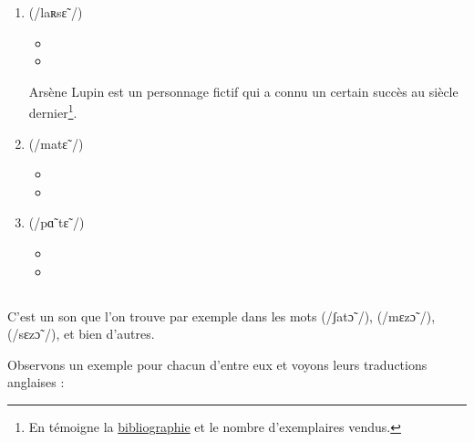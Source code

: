 \begin{enumerate}
\item {} (/laʀsɛ̃ /)
  \begin{itemize}
  \item {}
    \item {}
    \end{itemize}
    Arsène Lupin est un personnage fictif qui a connu un certain
    succès au siècle dernier\footnote{En témoigne la
      \href{https://www.amazon.fr/gp/product/B01N7I8WHS/ref=as_li_tl?ie=UTF8&camp=1642&creative=6746&creativeASIN=B01N7I8WHS&linkCode=as2&tag=wwwbecomefree-21&linkId=b8a42c0dbe0bb02385db28679d7e46fd}{bibliographie}
      et le nombre d'exemplaires vendus.}.
\item {} (/matɛ̃ /)
  \begin{itemize}
  \item {}
  \item {}
  \end{itemize}
\item {} (/pɑ̃ tɛ̃ /)
  \begin{itemize}
  \item {}
  \item {}
  \end{itemize}
\end{enumerate}         

\subsection{}\label{subsec:ctfr}
C'est un son que l'on trouve par exemple dans les mots
 (/ʃatɔ̃ /),  (/mɛzɔ̃ /),  (/sɛzɔ̃ /), et bien d'autres.

Observons un exemple pour chacun d'entre eux et voyons leurs
traductions anglaises :\par

